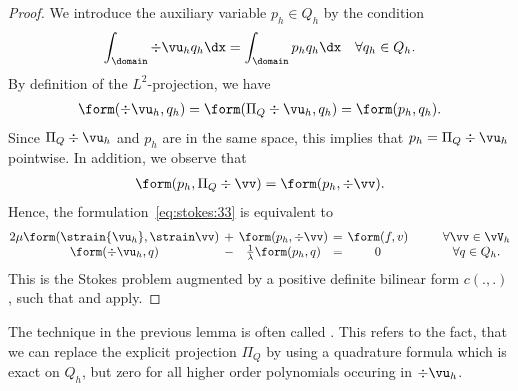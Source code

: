 \begin{proof}
  We introduce the auxiliary variable $p_h\in Q_h$ by the condition
  \begin{gather}
    \int_\domain \div \vu_h q_h \dx = \int_\domain p_h q_h\dx
    \quad\forall q_h\in Q_h.
  \end{gather}
  By definition of the $L^2$-projection, we have
  \begin{gather}
    \form(\div \vu_h, q_h) = \form(\Pi_Q\div \vu_h,q_h) = \form(p_h,q_h).
  \end{gather}
  Since $\Pi_Q\div \vu_h$ and $p_h$ are in the same space, this implies
  that $p_h = \Pi_Q\div \vu_h$ pointwise. In addition, we observe that
  \begin{gather}
    \form (p_h, \Pi_Q\div \vv) = \form (p_h, \div \vv).
  \end{gather}
  Hence, the formulation~\eqref{eq:stokes:33} is equivalent to
  \begin{gather}
    \arraycolsep2pt
    \begin{matrix}
      2\mu\form(\strain{\vu_h},\strain \vv) &+& \form(p_h,\div \vv)
      &=& \form(f,v) &\qquad&\forall \vv\in \vV_h\\
      \form(\div \vu_h, q) &-&\tfrac1\lambda\form(p_h,q)&=&0&&\forall q\in Q_h.
    \end{matrix}
  \end{gather}
  This is the Stokes problem augmented by a positive definite bilinear
  form $c(.,.)$, such that
   and
   apply.
\end{proof}

\begin{remark}
  The technique in the previous lemma is often called . This refers to the fact, that we can replace the
  explicit projection $\Pi_Q$ by using a quadrature formula which is
  exact on $Q_h$, but zero for all higher order polynomials occuring
  in $\div \vu_h$.
\end{remark}

